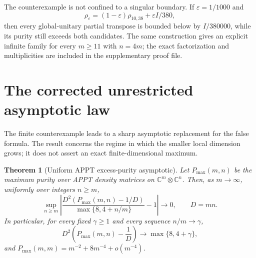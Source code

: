 \documentclass[11pt]{article}
\newtheorem{theorem}{Theorem}[section]
\theoremstyle{remark}\newtheorem{remark}[theorem]{Remark}
\newcommand{\C}{\mathbb C}
\begin{document}
The counterexample is not confined to a singular boundary. If $\varepsilon=1/1000$ and
\[
 \rho_\varepsilon=(1-\varepsilon)\rho_{10,38}+\varepsilon I/380,
\]
then every global-unitary partial transpose is bounded below by $I/380000$, while its purity still exceeds both candidates. The same construction gives an explicit infinite family for every $m\geq11$ with $n=4m$; the exact factorization and multiplicities are included in the supplementary proof file.

\section{The corrected unrestricted asymptotic law}
\label{sec:asymptotic}
The finite counterexample leads to a sharp asymptotic replacement for the false formula. The result concerns the regime in which the smaller local dimension grows; it does not assert an exact finite-dimensional maximum.

\begin{theorem}[Uniform APPT excess-purity asymptotic]\label{thm:asymptotic}
Let $P_{\max}(m,n)$ be the maximum purity over APPT density matrices on $\C^m\otimes\C^n$. Then, as $m\to\infty$, uniformly over integers $n\geq m$,
\begin{equation}\label{eq:asymptotic-law}
 \sup_{n\geq m}\left|
 \frac{D^2\left(P_{\max}(m,n)-1/D\right)}{\max\{8,4+n/m\}}-1\right|\longrightarrow0,
 \qquad D=mn.
\end{equation}
In particular, for every fixed $\gamma\geq1$ and every sequence $n/m\to\gamma$,
\[
 D^2\left(P_{\max}(m,n)-\frac1D\right)\longrightarrow\max\{8,4+\gamma\},
\]
and $P_{\max}(m,m)=m^{-2}+8m^{-4}+o(m^{-4})$.
\end{theorem}
\end{document}
